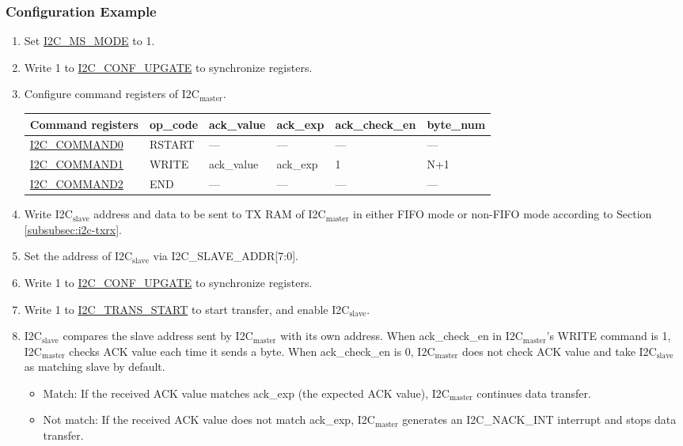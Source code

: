 \documentclass[main\_\_EN.tex]{subfiles}
\begin{document}
\subsubsection{Configuration Example}
\begin{enumerate}
\item Set \hyperref[fielddesc:I2CMSMODE]{I2C\_MS\_MODE} to 1.
\item Write 1 to \hyperref[fielddesc:I2CCONFUPGATE]{I2C\_CONF\_UPGATE} to synchronize registers.
\item Configure command registers of I2C$_\text{master}$.
\begin{longtable}{ | p{4cm} | p{2cm} | p{2cm} | p{2cm} |p{2cm} | p{2cm} |}
\hline\rowcolor{lightgray}
Command registers& op\_code & ack\_value&ack\_exp&ack\_check\_en&byte\_num  \\ \hline
\hyperref[fielddesc:I2CCOMMAND0]{I2C\_COMMAND0} & RSTART& ---&---&---&---  \\ \hline
\hyperref[fielddesc:I2CCOMMAND1]{I2C\_COMMAND1} & WRITE& ack\_value&ack\_exp&1&N+1  \\ \hline
\hyperref[fielddesc:I2CCOMMAND2]{I2C\_COMMAND2} & END& ---&---&---&---  \\ \hline
\end{longtable}
\item Write I2C$_\text{slave}$ address and data to be sent to TX RAM of I2C$_\text{master}$ in either FIFO mode or non-FIFO mode according to Section \ref{subsubsec:i2c-txrx}.
\item Set the address of I2C$_\text{slave}$ via I2C\_SLAVE\_ADDR[7:0].
\item Write 1 to \hyperref[fielddesc:I2CCONFUPGATE]{I2C\_CONF\_UPGATE} to synchronize registers.
\item Write 1 to \hyperref[fielddesc:I2CTRANSSTART]{I2C\_TRANS\_START} to start transfer, and enable I2C$_\text{slave}$.
\item I2C$_\text{slave}$ compares the slave address sent by I2C$_\text{master}$ with its own address. When ack\_check\_en in I2C$_\text{master}$'s WRITE command is 1, I2C$_\text{master}$ checks ACK value each time it sends a byte. When ack\_check\_en is 0, I2C$_\text{master}$ does not check ACK value and take I2C$_\text{slave}$ as matching slave by default.
\begin{itemize}
\item Match: If the received ACK value matches ack\_exp (the expected ACK value), I2C$_\text{master}$ continues data transfer.
\item Not match: If the received ACK value does not match ack\_exp, I2C$_\text{master}$ generates an I2C\_NACK\_INT interrupt and stops data transfer.
\end{itemize}


\end{enumerate}
\end{document}
